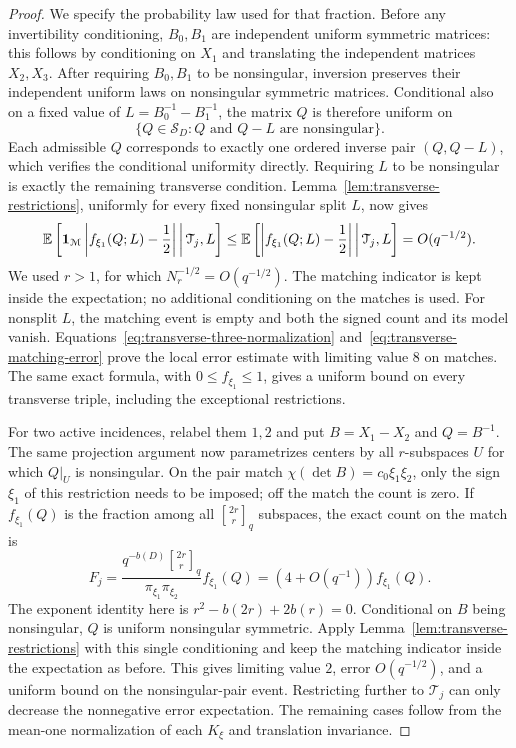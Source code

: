 \begin{proof}
We specify the probability law used for that fraction. Before any
invertibility conditioning, $B_0,B_1$ are independent uniform symmetric
matrices: this follows by conditioning on $X_1$ and translating the
independent matrices $X_2,X_3$. After requiring $B_0,B_1$ to be
nonsingular, inversion preserves their independent uniform laws on
nonsingular symmetric matrices. Conditional also on a fixed value of
$L=B_0^{-1}-B_1^{-1}$, the matrix $Q$ is therefore uniform on
\[
 \{Q\in\mathcal S_D:Q\text{ and }Q-L\text{ are nonsingular}\}.
\]
Each admissible $Q$ corresponds to exactly one ordered inverse pair
$(Q,Q-L)$, which verifies the conditional uniformity directly.
Requiring $L$ to be nonsingular is exactly the remaining transverse
condition. Lemma~\ref{lem:transverse-restrictions}, uniformly for every
fixed nonsingular split $L$, now gives
\begin{equation}
\label{eq:transverse-matching-error}
 \mathbb E\left[\mathbf 1_{\mathcal M}
       \left|f_{\xi_1}(Q;L)-\frac12\right|
       \,\middle|\,\mathcal T_j,L\right]
 \leq \mathbb E\left[\left|f_{\xi_1}(Q;L)-\frac12\right|
       \,\middle|\,\mathcal T_j,L\right]
 =O(q^{-1/2}).
\end{equation}
We used $r>1$, for which $N_r^{-1/2}=O(q^{-1/2})$.
The matching indicator is kept inside the expectation; no additional
conditioning on the matches is used. For nonsplit $L$, the matching
event is empty and both the signed count and its model vanish.
Equations~\eqref{eq:transverse-three-normalization}
and~\eqref{eq:transverse-matching-error} prove the local error estimate
with limiting value $8$ on matches. The same exact formula, with
$0\leq f_{\xi_1}\leq1$, gives a uniform bound on every transverse
triple, including the exceptional restrictions.

For two active incidences, relabel them $1,2$ and put $B=X_1-X_2$ and
$Q=B^{-1}$. The same projection argument now parametrizes centers by
all $r$-subspaces $U$ for which $Q|_U$ is nonsingular. On the pair match
$\chi(\det B)=c_0\xi_1\xi_2$, only the sign $\xi_1$ of this restriction
needs to be imposed; off the match the count is zero. If $f_{\xi_1}(Q)$
is the fraction among all $\genfrac{[}{]}{0pt}{}{2r}{r}_q$ subspaces,
the exact count on the match is
\begin{equation}
\label{eq:transverse-two-normalization}
 F_j=\frac{q^{-b(D)}\genfrac{[}{]}{0pt}{}{2r}{r}_q}
              {\pi_{\xi_1}\pi_{\xi_2}}
       f_{\xi_1}(Q)
     =(4+O(q^{-1}))f_{\xi_1}(Q).
\end{equation}
The exponent identity here is $r^2-b(2r)+2b(r)=0$. Conditional on $B$
being nonsingular, $Q$ is uniform nonsingular symmetric. Apply
Lemma~\ref{lem:transverse-restrictions} with this single conditioning
and keep the matching indicator inside the expectation as before.
This gives limiting value $2$, error $O(q^{-1/2})$, and a uniform
bound on the nonsingular-pair event. Restricting further to
$\mathcal T_j$ can only decrease the nonnegative error expectation.
The remaining cases follow from the mean-one normalization of each
$K_\xi$ and translation invariance.
\end{proof}


